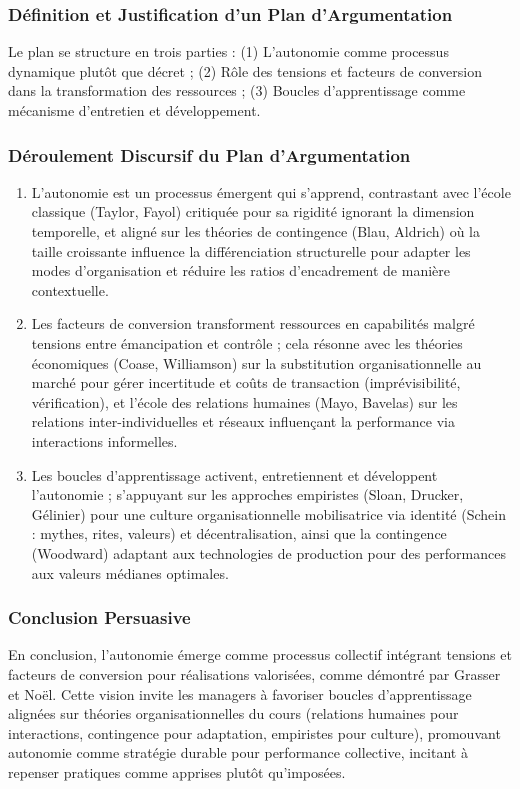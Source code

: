 \documentclass[11pt]{rapportECL}
\begin{document}
\subsubsection{Définition et Justification d’un Plan d’Argumentation}
Le plan se structure en trois parties : (1) L’autonomie comme processus dynamique plutôt que décret ; (2) Rôle des tensions et facteurs de conversion dans la transformation des ressources ; (3) Boucles d’apprentissage comme mécanisme d’entretien et développement.

\subsubsection{Déroulement Discursif du Plan d’Argumentation}
\begin{enumerate}
\item L’autonomie est un processus émergent qui s’apprend, contrastant avec l’école classique (Taylor, Fayol) critiquée pour sa rigidité ignorant la dimension temporelle, et aligné sur les théories de contingence (Blau, Aldrich) où la taille croissante influence la différenciation structurelle pour adapter les modes d’organisation et réduire les ratios d’encadrement de manière contextuelle.
\item Les facteurs de conversion transforment ressources en capabilités malgré tensions entre émancipation et contrôle ; cela résonne avec les théories économiques (Coase, Williamson) sur la substitution organisationnelle au marché pour gérer incertitude et coûts de transaction (imprévisibilité, vérification), et l’école des relations humaines (Mayo, Bavelas) sur les relations inter-individuelles et réseaux influençant la performance via interactions informelles.
\item Les boucles d’apprentissage activent, entretiennent et développent l’autonomie ; s’appuyant sur les approches empiristes (Sloan, Drucker, Gélinier) pour une culture organisationnelle mobilisatrice via identité (Schein : mythes, rites, valeurs) et décentralisation, ainsi que la contingence (Woodward) adaptant aux technologies de production pour des performances aux valeurs médianes optimales.
\end{enumerate}

\subsubsection{Conclusion Persuasive}
En conclusion, l’autonomie émerge comme processus collectif intégrant tensions et facteurs de conversion pour réalisations valorisées, comme démontré par Grasser et Noël. Cette vision invite les managers à favoriser boucles d’apprentissage alignées sur théories organisationnelles du cours (relations humaines pour interactions, contingence pour adaptation, empiristes pour culture), promouvant autonomie comme stratégie durable pour performance collective, incitant à repenser pratiques comme apprises plutôt qu’imposées.
\end{document}
